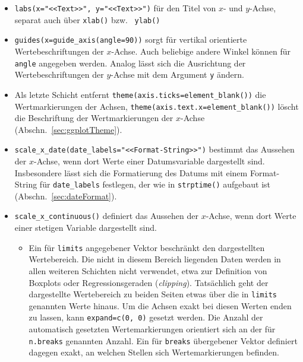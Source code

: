 \begin{itemize}
\item {} \lstinline!labs(x="<<Text>>", y="<<Text>>")! für den Titel von $x$- und $y$-Achse, separat auch über  \lstinline!xlab()! bzw.\  \lstinline!ylab()!
\item \lstinline!guides(x=guide_axis(angle=90))! sorgt für vertikal orientierte Wertebeschriftungen der $x$-Achse. Auch beliebige andere Winkel können für \lstinline!angle! angegeben werden. Analog lässt sich die Ausrichtung der Wertebeschriftungen der $y$-Achse mit dem Argument \lstinline!y! ändern.
\item Als letzte Schicht entfernt \lstinline!theme(axis.ticks=element_blank())! die Wertmarkierungen der Achsen, \lstinline!theme(axis.text.x=element_blank())! löscht die Beschriftung der Wertmarkierungen der $x$-Achse (Abschn.\ \ref{sec:ggplotTheme}).
\item {} \lstinline!scale_x_date(date_labels="<<Format-String>>")! bestimmt das Aussehen der $x$-Achse, wenn dort Werte einer Datumsvariable dargestellt sind. Insbesondere lässt sich die Formatierung des Datums mit einem Format-String für \lstinline!date_labels! festlegen, der wie in \lstinline!strptime()! aufgebaut ist (Abschn.\ \ref{sec:dateFormat}).
\item {} \lstinline!scale_x_continuous()! definiert das Aussehen der $x$-Achse, wenn dort Werte einer stetigen Variable dargestellt sind.
\begin{itemize}
\item Ein für \lstinline!limits! angegebener Vektor beschränkt den dargestellten Wertebereich. Die nicht in diesem Bereich liegenden Daten werden in allen weiteren Schichten nicht verwendet, etwa zur Definition von Boxplots oder Regressionsgeraden (\emph{clipping}). Tatsächlich geht der dargestellte Wertebereich zu beiden Seiten etwas über die in \lstinline!limits! genannten Werte hinaus. Um die Achsen exakt bei diesen Werten enden zu lassen, kann \lstinline!expand=c(0, 0)! gesetzt werden. Die Anzahl der automatisch gesetzten Wertemarkierungen orientiert sich an der für \lstinline!n.breaks! genannten Anzahl. Ein für \lstinline!breaks! übergebener Vektor definiert dagegen exakt, an welchen Stellen sich Wertemarkierungen befinden.

\end{itemize}
\end{itemize}
